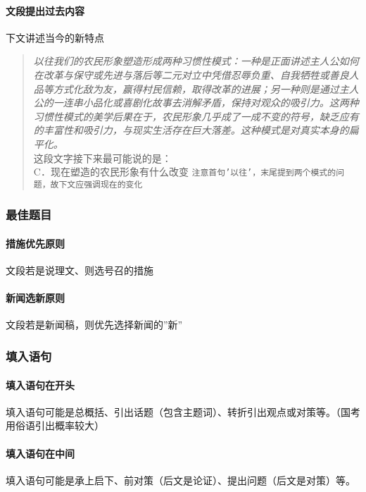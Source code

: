 \paragraph{文段提出过去内容} 下文讲述当今的新特点
\begin{quote}
	\begin{tcolorbox}[colback=blue!5, colframe=blue!75!black, title=文段提出过去内容案例]
		\textit{以往我们的农民形象塑造形成两种习惯性模式：一种是正面讲述主人公如何在改革与保守或先进与落后等二元对立中凭借忍辱负重、自我牺牲或善良人品等方式化敌为友，赢得村民信赖，取得改革的进展；另一种则是通过主人公的一连串小品化或喜剧化故事去消解矛盾，保持对观众的吸引力。这两种习惯性模式的美学后果在于，农民形象几乎成了一成不变的符号，缺乏应有的丰富性和吸引力，与现实生活存在巨大落差。这种模式是对真实本身的扁平化。}\\
		这段文字接下来最可能说的是：\\
		C．现在塑造的农民形象有什么改变
		\tcblower%
		\texttt{注意首句'以往'，末尾提到两个模式的问题，故下文应强调现在的变化}
	\end{tcolorbox}
\end{quote}

\subsubsection{最佳题目}

\paragraph{措施优先原则}

文段若是说理文、则选号召的措施

\paragraph{新闻选新原则}

文段若是新闻稿，则优先选择新闻的''新''

\subsubsection{填入语句}

\paragraph{填入语句在开头} 填入语句可能是总概括、引出话题（包含主题词）、转折引出观点或对策等。（国考用俗语引出概率较大）
\paragraph{填入语句在中间} 填入语句可能是承上启下、前对策（后文是论证）、提出问题（后文是对策）等。
